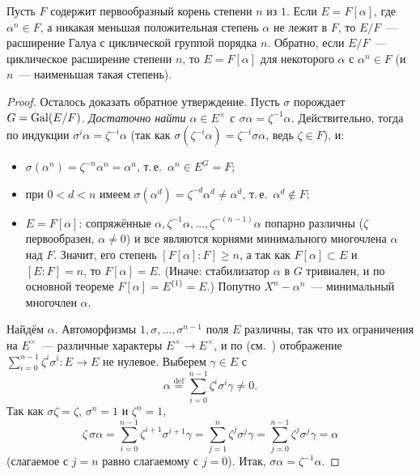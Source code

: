 \begin{proposition}[5.27]
Пусть $F$ содержит первообразный корень степени $n$ из $1$. Если $E=F[\alpha]$, где $\alpha^n\in F$, а никакая меньшая
положительная степень $\alpha$ не лежит в $F$, то $E/F$~--- расширение Галуа с циклической группой порядка $n$. Обратно,
если $E/F$~--- циклическое расширение степени $n$, то $E=F[\alpha]$ для некоторого $\alpha$ с $\alpha^n\in F$ (и $n$~---
наименьшая такая степень).
\end{proposition}

\begin{proof}
Осталось доказать обратное утверждение. Пусть $\sigma$ порождает $G=\operatorname{Gal}(E/F)$. \emph{Достаточно найти $\alpha\in
E^\times$ с $\sigma\alpha=\zeta^{-1}\alpha$.} Действительно, тогда по индукции $\sigma^i\alpha=\zeta^{-i}\alpha$ (так как
$\sigma(\zeta^{-i}\alpha)=\zeta^{-i}\sigma\alpha$, ведь $\zeta\in F$), и:
\begin{itemize}[leftmargin=*]
\item $\sigma(\alpha^n)=\zeta^{-n}\alpha^n=\alpha^n$, т.\,е.\ $\alpha^n\in E^G=F$;
\item при $0<d<n$ имеем $\sigma(\alpha^d)=\zeta^{-d}\alpha^d\ne\alpha^d$, т.\,е.\ $\alpha^d\notin F$;
\item $E=F[\alpha]$: сопряжённые $\alpha,\zeta^{-1}\alpha,\dots,\zeta^{-(n-1)}\alpha$ попарно различны ($\zeta$
первообразен, $\alpha\ne0$) и все являются корнями минимального многочлена $\alpha$ над $F$. Значит, его степень
$[F[\alpha]:F]\ge n$, а так как $F[\alpha]\subset E$ и $[E:F]=n$, то $F[\alpha]=E$. (Иначе: стабилизатор $\alpha$ в $G$
тривиален, и по основной теореме $F[\alpha]=E^{\{1\}}=E$.) Попутно $X^n-\alpha^n$~--- минимальный многочлен $\alpha$.
\end{itemize}
Найдём $\alpha$. Автоморфизмы $1,\sigma,\dots,\sigma^{n-1}$ поля $E$ различны, так что их ограничения на $E^\times$~---
различные характеры $E^\times\to E^\times$, и по  (см.~) отображение $\sum_{i=0}^{n-1}\zeta^i\sigma^i\colon
E\to E$ не нулевое. Выберем $\gamma\in E$ с
\[
\alpha\overset{\text{def}}=\sum_{i=0}^{n-1}\zeta^i\sigma^i\gamma\ne0.
\]
Так как $\sigma\zeta=\zeta$, $\sigma^n=1$ и $\zeta^n=1$,
\[
\zeta\,\sigma\alpha=\sum_{i=0}^{n-1}\zeta^{i+1}\sigma^{i+1}\gamma=\sum_{j=1}^{n}\zeta^j\sigma^j\gamma
=\sum_{j=0}^{n-1}\zeta^j\sigma^j\gamma=\alpha
\]
(слагаемое с $j=n$ равно слагаемому с $j=0$). Итак, $\sigma\alpha=\zeta^{-1}\alpha$.
\end{proof}

